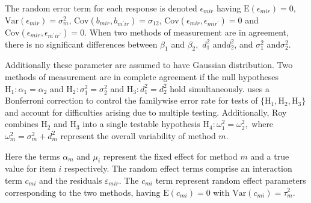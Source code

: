 \documentclass[12pt, a4paper]{report}
\theoremstyle{plain}
\theoremstyle{definition}
\theoremstyle{remark}
\begin{document}

The random error term for each response is denoted $\epsilon_{mir}$ having $\mathrm{E}(\epsilon_{mir})=0$, $\mathrm{Var}(\epsilon_{mir})=\sigma^2_m$, $\mathrm{Cov}(b_{mir}, b_{m^\prime ir})=\sigma_{12}$, $\mathrm{Cov}(\epsilon_{mir}, \epsilon_{mir^\prime})= 0$ and $\mathrm{Cov}(\epsilon_{mir}, \epsilon_{m^\prime ir^\prime})= 0.$
When two methods of measurement are in agreement, there is no significant differences between $\beta_1$ and $\beta_2,$ $d^2_1 $ and$ d^2_2$, and $\sigma^2_1 $ and$ \sigma^2_2$.
\bigskip



Additionally these parameter are assumed to have Gaussian distribution. Two methods of measurement are in complete agreement if the null hypotheses $\mathrm{H}_1\colon \alpha_1 = \alpha_2$ and $\mathrm{H}_2\colon \sigma^2_1 = \sigma^2_2 $ and $\mathrm{H}_3\colon d^2_1= d^2_2$ hold simultaneously. \citet{ARoy2009} uses a Bonferroni correction to control the familywise error rate for tests of $\{\mathrm{H}_1, \mathrm{H}_2, \mathrm{H}_3\}$ and account for difficulties arising due to multiple testing. Additionally, Roy combines $\mathrm{H}_2$ and $\mathrm{H}_3$ into a single testable hypothesis $\mathrm{H}_4\colon \omega^2_1=\omega^2_2,$ where $\omega^2_m = \sigma^2_m + d^2_m$ represent the overall variability of method $m.$



Here the terms $\alpha_{m}$ and $\mu_{i}$ represent the fixed effect for method $m$ and a true value for item $i$ respectively. The random effect terms comprise an interaction term $c_{mi}$ and the residuals $\varepsilon_{mir}$.
The $c_{mi}$ term represent random effect parameters corresponding to the two methods, having $\mathrm{E}(c_{mi})= 0$ with $\mathrm{Var}(c_{mi})=\tau^2_m$.  
\end{document}
